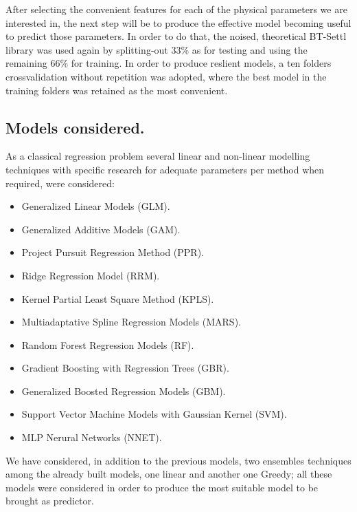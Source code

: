 {
After selecting the convenient features for each of the 
physical parameters we are interested in, the next step will be
to produce the effective model becoming useful to predict those 
parameters. In order to do that, the noised, theoretical 
BT-Settl library was used again by splitting-out 33\% as for testing 
and using the remaining 66\% for training.
In order to produce reslient models, a ten folders 
crossvalidation without repetition was adopted, where the best 
model in the training folders was retained as the 
most convenient.
}

\subsection{Models considered.}
\label {ssub:models}
{
As a classical regression problem several linear and non-linear
modelling techniques with specific research for 
adequate parameters per method when required, were considered:
\begin{itemize}
 \item {Generalized Linear Models (GLM).}
 \item {Generalized Additive Models (GAM).}
 \item {Project Pursuit Regression Method (PPR).}
 \item {Ridge Regression Model (RRM).}
 \item {Kernel Partial Least Square Method (KPLS).}
 \item {Multiadaptative Spline Regression Models (MARS).}
 \item {Random Forest Regression Models (RF).}
 \item {Gradient Boosting with Regression Trees (GBR).}
 \item {Generalized Boosted Regression Models (GBM).}
 \item {Support Vector Machine Models with Gaussian Kernel (SVM).}
 \item {MLP Nerural Networks (NNET).}
\end{itemize}

We have considered, in addition to the previous models, 
two ensembles techniques among the already built models, 
one linear and another one Greedy; 
all these models were considered in order to produce 
the most suitable model to be brought as predictor.
}

